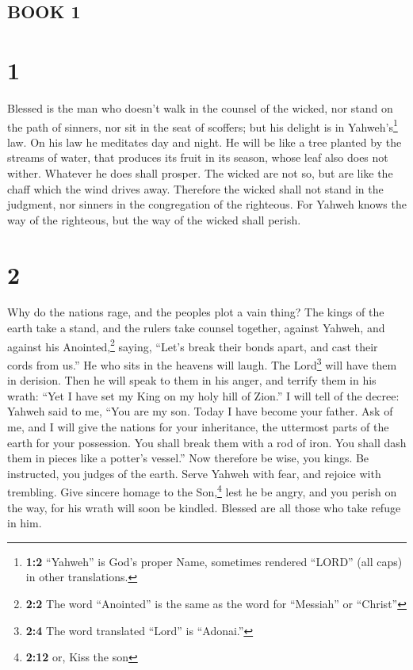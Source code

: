 \hypertarget{book-1}{%
\subsection{BOOK 1}\label{book-1}}

\hypertarget{section}{%
\section{1}\label{section}}

 Blessed is the man who doesn't walk in the counsel of the
wicked, nor stand on the path of sinners, nor sit in the seat of
scoffers;  but his delight is in Yahweh's\footnote{\textbf{1:2}
  ``Yahweh'' is God's proper Name, sometimes rendered ``LORD'' (all
  caps) in other translations.} law. On his law he meditates day and
night.  He will be like a tree planted by the streams of
water, that produces its fruit in its season, whose leaf also does not
wither. Whatever he does shall prosper.  The wicked are
not so, but are like the chaff which the wind drives away.
 Therefore the wicked shall not stand in the judgment, nor
sinners in the congregation of the righteous.  For Yahweh
knows the way of the righteous, but the way of the wicked shall perish.

\hypertarget{section-1}{%
\section{2}\label{section-1}}

 Why do the nations rage, and the peoples plot a vain
thing?  The kings of the earth take a stand, and the
rulers take counsel together, against Yahweh, and against his
Anointed,\footnote{\textbf{2:2} The word ``Anointed'' is the same as the
  word for ``Messiah'' or ``Christ''} saying,  ``Let's
break their bonds apart, and cast their cords from us.'' 
He who sits in the heavens will laugh. The Lord\footnote{\textbf{2:4}
  The word translated ``Lord'' is ``Adonai.''} will have them in
derision.  Then he will speak to them in his anger, and
terrify them in his wrath:  ``Yet I have set my King on my
holy hill of Zion.''  I will tell of the decree: Yahweh
said to me, ``You are my son. Today I have become your father.
 Ask of me, and I will give the nations for your
inheritance, the uttermost parts of the earth for your possession.
 You shall break them with a rod of iron. You shall dash
them in pieces like a potter's vessel.''  Now therefore
be wise, you kings. Be instructed, you judges of the earth.
 Serve Yahweh with fear, and rejoice with trembling.
 Give sincere homage to the Son,\footnote{\textbf{2:12}
  or, Kiss the son} lest he be angry, and you perish on the way, for his
wrath will soon be kindled. Blessed are all those who take refuge in
him.


